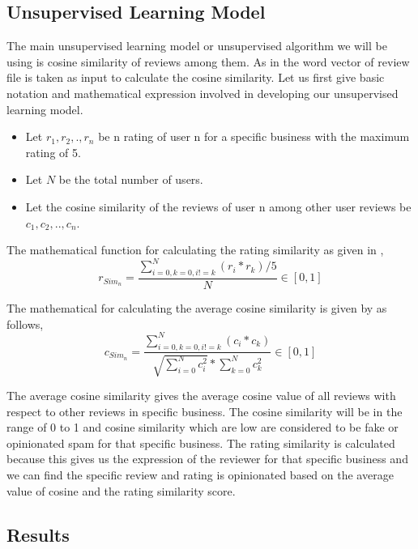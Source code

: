\documentclass[sigconf]{acmart}
\begin{document}
\subsection{Unsupervised Learning Model}

The main unsupervised learning model or unsupervised algorithm we will be using is cosine similarity of reviews among them. As in \cite{originalPaper} the word vector of review file is taken as input to calculate the cosine similarity. Let us first give basic notation and mathematical expression involved in developing our unsupervised learning model.

\begin{itemize}
    \item Let \(r_1,r_2,.,r_n\) be n rating of user n for a specific business with the maximum rating of 5.
    \item Let \(N\) be the total number of users.
    \item Let the cosine similarity of the reviews of user n among other user reviews be \(c_1,c_2,..,c_n\).
\end{itemize}

The mathematical function for calculating the rating similarity as given in \cite{originalPaper},
\begin{equation}
    r_{Sim_{n}} = \frac{\sum_{i=0,k=0,i!=k}^{N}(r_i*r_k)/5}{N} \in [0,1]
\end{equation}

The mathematical for calculating the average cosine similarity is given by as follows,
\begin{equation}
    c_{Sim_n} = \frac{\sum_{i=0,k=0,i!=k}^{N}(c_i*c_k)}{\sqrt{\sum_{i=0}^{N}c_i^2}* \sum_{k=0}^{N}c_k^2} \in [0,1]
\end{equation}

The average cosine similarity gives the average cosine value of all reviews with respect to other reviews in specific business. The cosine similarity will be in the range of 0 to 1 and cosine similarity which are low are considered to be fake or opinionated spam for that specific business. The rating similarity is calculated because this gives us the expression of the reviewer for that specific business and we can find the specific review and rating is opinionated based on the average value of cosine and the rating similarity score.

\subsection{Results}
\end{document}
